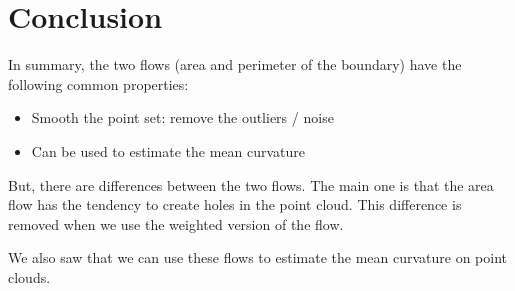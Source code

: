 \section{Conclusion}

In summary, the two flows (area and perimeter of the boundary) have the
following common properties:
\begin{itemize}
    \item Smooth the point set: remove the outliers / noise
    \item Can be used to estimate the mean curvature
\end{itemize}
But, there are differences between the two flows. The main one is that the area
flow has the tendency to create holes in the point cloud. This difference is
removed when we use the weighted version of the flow.

We also saw that we can use these flows to estimate the mean curvature on point
clouds.

